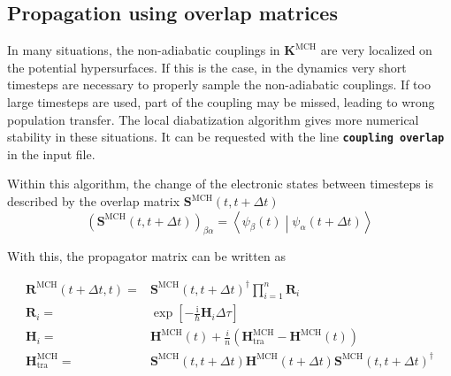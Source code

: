 \documentclass[a4paper,11pt,DIV=15,openany,twoside=false]{scrbook}
\newcommand{\tthdump}[1]{#1}
\newcommand{\ttt}[1]{\textbf{\texttt{#1}}}
\newcommand{\I}{\ensuremath{\mathrm{i}}}
\newcommand{\VEC}[1]{\ensuremath{\mathbf{#1}}}
\begin{document}
\subsection{Propagation using overlap matrices}

In many situations, the non-adiabatic couplings in $\VEC{K}^{\text{MCH}}$ are very localized on the potential hypersurfaces. If this is the case, in the dynamics very short timesteps are necessary to properly sample the non-adiabatic couplings. If too large timesteps are used, part of the coupling may be missed, leading to wrong population transfer. The local diabatization algorithm gives more numerical stability in these situations. It can be requested with the line \ttt{coupling overlap} in the input file.

Within this algorithm, the change of the electronic states between timesteps is described by the overlap matrix $\VEC{S}^{\text{MCH}}(t,t+\Delta t)$
\begin{equation}
  \left(\VEC{S}^{\text{MCH}}(t,t+\Delta t)\right)_{\beta\alpha}=
  \left\langle
    \psi_\beta(t)
  \middle|
    \psi_\alpha(t+\Delta t)
  \right\rangle
\end{equation}

With this, the propagator matrix can be written as
\tthdump{
  \begin{align}
    \VEC{R}^{\text{MCH}}(t+\Delta t,t)=&
    \VEC{S}^{\text{MCH}}(t,t+\Delta t)^\dagger\prod\limits_{i=1}^{n}
    \VEC{R}_i\\
    \VEC{R}_i=&
    \exp\left[
        -\frac{\I}{\hbar}\VEC{H}_i\Delta\tau
    \right]\\
    \VEC{H}_i=&
    \VEC{H}^{\text{MCH}}(t) + \frac{i}{n}
    \left(
      \VEC{H}^{\text{MCH}}_{\text{tra}}
      -\VEC{H}^{\text{MCH}}(t)
    \right)\label{eq:ham_propl}\\
    \VEC{H}^{\text{MCH}}_{\text{tra}}=&
      \VEC{S}^{\text{MCH}}(t,t+\Delta t)
      \VEC{H}^{\text{MCH}}(t+\Delta t)
      \VEC{S}^{\text{MCH}}(t,t+\Delta t)^\dagger
  \end{align}
}
\end{document}
